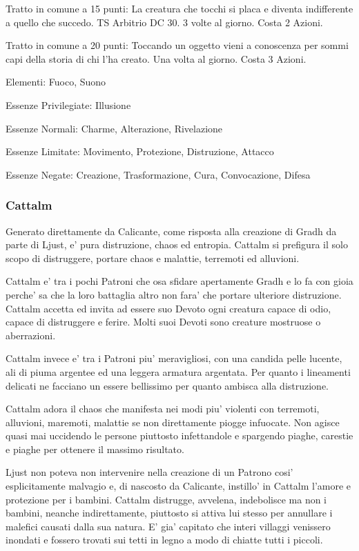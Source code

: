 \documentclass[a4paper,11pt,twoside,openany]{book}
\begin{document}
{		Tratto in comune a 15 punti: La creatura che tocchi si placa e diventa indifferente a quello che succedo. TS Arbitrio DC 30. 3 volte al giorno. Costa 2 Azioni.
		
		Tratto in comune a 20 punti: Toccando un oggetto vieni a conoscenza per sommi capi della storia di chi l'ha creato. Una volta al giorno. Costa 3 Azioni.
		
		\bigskip
		
		Elementi: Fuoco, Suono
		
		\bigskip
		
		Essenze Privilegiate: Illusione
		
		Essenze Normali: Charme, Alterazione, Rivelazione
		
		Essenze Limitate: Movimento, Protezione, Distruzione, Attacco
		
		Essenze Negate: Creazione, Trasformazione, Cura, Convocazione, Difesa
		
		\subsubsection{Cattalm}
		
		\label{cattalm}
		
		Generato direttamente da Calicante, come risposta alla creazione di Gradh da parte di Ljust, e' pura distruzione, chaos ed entropia. Cattalm si prefigura il solo scopo di distruggere, portare chaos e malattie, terremoti ed alluvioni.
		
		Cattalm e' tra i pochi Patroni che osa sfidare apertamente Gradh e lo fa con gioia perche' sa che la loro battaglia altro non fara' che portare ulteriore distruzione. Cattalm accetta ed invita ad essere suo Devoto ogni creatura capace di odio, capace di distruggere e ferire. Molti suoi Devoti sono creature mostruose o aberrazioni.
		
		Cattalm invece e' tra i Patroni piu' meravigliosi, con una candida pelle lucente, ali di piuma argentee ed una leggera armatura argentata. Per quanto i lineamenti delicati ne facciano un essere bellissimo per quanto ambisca alla distruzione.
		
		Cattalm adora il chaos che manifesta nei modi piu' violenti con terremoti, alluvioni, maremoti, malattie se non direttamente piogge infuocate. Non agisce quasi mai uccidendo le persone piuttosto infettandole e spargendo piaghe, carestie e piaghe per ottenere il massimo risultato.
		
		Ljust non poteva non intervenire nella creazione di un Patrono cosi' esplicitamente malvagio e, di nascosto da Calicante, instillo' in Cattalm l'amore e protezione per i bambini. Cattalm distrugge, avvelena, indebolisce ma non i bambini, neanche indirettamente, piuttosto si attiva lui stesso per annullare i malefici causati dalla sua natura.
		E' gia' capitato che interi villaggi venissero inondati e fossero trovati sui tetti in legno a modo di chiatte tutti i piccoli.
		
}
\end{document}
